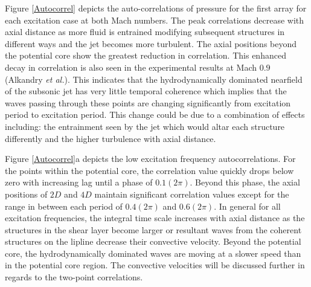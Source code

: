\documentclass[english]{aiaa-tc}
\begin{document}
Figure \ref{Autocorrel} depicts the auto-correlations of pressure for the first array for each excitation case at both Mach numbers. The peak correlations decrease with axial distance as more fluid is entrained modifying subsequent structures in different ways and the jet becomes more turbulent. The axial positions beyond the potential core show the greatest reduction in correlation. This enhanced decay in correlation is also seen in the experimental results at Mach $0.9$ (Alkandry {\em et al.}\cite{Alkandry2013}). This indicates that the hydrodynamically dominated nearfield of the subsonic jet has very little temporal coherence which implies that the waves passing through these points are changing significantly from excitation period to excitation period. This change could be due to a combination of effects including: the entrainment seen by the jet which would altar each structure differently and the higher turbulence with axial distance.

Figure \ref{Autocorrel}a depicts the low excitation frequency autocorrelations. For the points within the potential core, the correlation value quickly drops below zero with increasing lag until a phase of $0.1(2\pi)$. Beyond this phase, the axial positions of $2D$ and $4D$ maintain significant correlation values except for the range in between each period of $0.4(2\pi)$ and $0.6(2\pi)$. In general for all excitation frequencies, the integral time scale increases with axial distance as the structures in the shear layer become larger  or resultant waves from the coherent structures on the lipline decrease their convective velocity. Beyond the potential core, the hydrodynamically dominated waves are moving at a slower speed than in the potential core region. The convective velocities will be discussed further in regards to the two-point correlations. 
\end{document}
